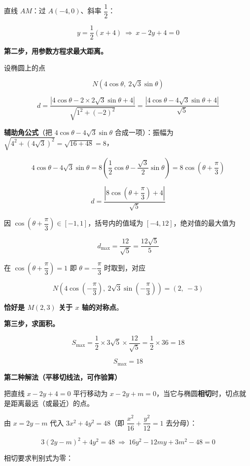 \begin{answer}
直线 $AM$：过 $A(-4,0)$、斜率 $\dfrac12$：

\nopagebreak[4]
\[y=\frac12(x+4)\ \Longrightarrow\ x-2y+4=0\]

\textbf{第二步，用参数方程求最大距离。}

设椭圆上的点

\nopagebreak[4]
\[N\left(4\cos\theta,\ 2\sqrt3\sin\theta\right)\]

\nopagebreak[4]
\[d=\frac{\left|4\cos\theta-2\times2\sqrt3\sin\theta+4\right|}{\sqrt{1^{2}+(-2)^{2}}}=\frac{\left|4\cos\theta-4\sqrt3\sin\theta+4\right|}{\sqrt5}\]

\textbf{辅助角公式}（把 $4\cos\theta-4\sqrt3\sin\theta$ 合成一项）：振幅为 $\sqrt{4^{2}+\left(4\sqrt3\right)^{2}}=\sqrt{16+48}=8$，

\nopagebreak[4]
\[4\cos\theta-4\sqrt3\sin\theta=8\left(\frac12\cos\theta-\frac{\sqrt3}2\sin\theta\right)=8\cos\left(\theta+\frac\pi3\right)\]

\nopagebreak[4]
\[d=\frac{\left|8\cos\left(\theta+\dfrac\pi3\right)+4\right|}{\sqrt5}\]

因 $\cos\left(\theta+\dfrac\pi3\right)\in[-1,1]$，括号内的值域为 $[-4,12]$，绝对值的最大值为

\nopagebreak[4]
\[d_{\max}=\frac{12}{\sqrt5}=\frac{12\sqrt5}5\]

在 $\cos\left(\theta+\dfrac\pi3\right)=1$ 即 $\theta=-\dfrac\pi3$ 时取到，对应

\nopagebreak[4]
\[N\left(4\cos\left(-\frac\pi3\right),\ 2\sqrt3\sin\left(-\frac\pi3\right)\right)=(2,\ -3)\]

\textbf{恰好是 $M(2,3)$ 关于 $x$ 轴的对称点}。

\textbf{第三步，求面积。}

\nopagebreak[4]
\[S_{\max}=\frac12\times3\sqrt5\times\frac{12}{\sqrt5}=\frac12\times36=18\]

\nopagebreak[4]
\[\boxed{S_{\max}=18}\]

\par\medskip

\textbf{第二种解法（平移切线法，可作验算）}

把直线 $x-2y+4=0$ 平行移动为 $x-2y+m=0$，当它与椭圆\textbf{相切}时，切点就是距离最远（或最近）的点。

由 $x=2y-m$ 代入 $3x^{2}+4y^{2}=48$（即 $\dfrac{x^{2}}{16}+\dfrac{y^{2}}{12}=1$ 去分母）：

\nopagebreak[4]
\[3(2y-m)^{2}+4y^{2}=48\ \Longrightarrow\ 16y^{2}-12my+3m^{2}-48=0\]

相切要求判别式为零：


\end{answer}
